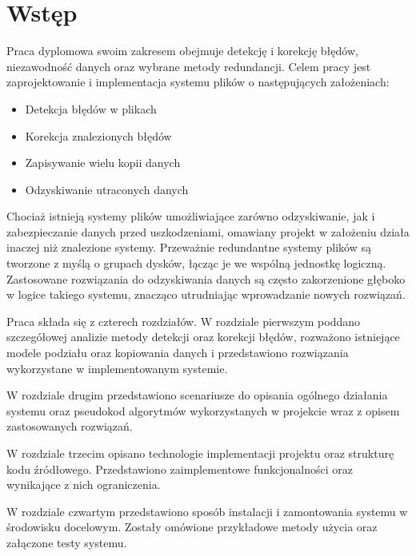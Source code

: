 \chapter{Wstęp}
\thispagestyle{chapterBeginStyle}

Praca dyplomowa swoim zakresem obejmuje detekcję i korekcję błędów, niezawodność danych oraz wybrane metody redundancji. Celem pracy jest zaprojektowanie i implementacja systemu plików o następujących założeniach:
\begin{itemize}
    \item Detekcja błędów w plikach
    \item Korekcja znalezionych błędów
    \item Zapisywanie wielu kopii danych
    \item Odzyskiwanie utraconych danych 
\end{itemize}

Chociaż istnieją systemy plików umożliwiające zarówno odzyskiwanie, jak i zabezpieczanie danych przed uszkodzeniami, omawiany projekt w założeniu działa inaczej niż znalezione systemy. Przeważnie redundantne systemy plików są tworzone z myślą o grupach dysków, łącząc je we wspólną jednostkę logiczną. Zastosowane rozwiązania do odzyskiwania danych są często zakorzenione głęboko w logice takiego systemu, znacząco utrudniając wprowadzanie nowych rozwiązań.

Praca składa się z czterech rozdziałów. W rozdziale pierwszym poddano szczegółowej analizie metody detekcji oraz korekcji błędów, rozważono istniejące modele podziału oraz kopiowania danych i przedstawiono rozwiązania wykorzystane w implementowanym systemie.

W rozdziale drugim przedstawiono scenariusze do opisania ogólnego działania systemu oraz pseudokod algorytmów wykorzystanych w projekcie wraz z opisem zastosowanych rozwiązań.

W rozdziale trzecim opisano technologie implementacji projektu oraz strukturę kodu źródłowego. Przedstawiono zaimplementowe funkcjonalności oraz wynikające z nich ograniczenia.

W rozdziale czwartym przedstawiono sposób instalacji i zamontowania systemu w środowisku docelowym. Zostały omówione przykładowe metody użycia oraz załączone testy systemu.

